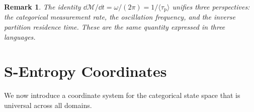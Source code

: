 \documentclass[11pt,twocolumn,a4paper]{article}
\newtheorem{remark}[theorem]{Remark}
\newcommand{\Meas}{\mathcal{M}}
\newcommand{\taup}{\tau_{\mathrm{p}}}
\begin{document}
\begin{remark}
The identity $\dd{\Meas}/\dd{t} = \omega/(2\pi) =
1/\langle \taup \rangle$ unifies three perspectives: the categorical
measurement rate, the oscillation frequency, and the inverse partition
residence time. These are the same quantity expressed in three
languages.
\end{remark}


\section{S-Entropy Coordinates}
\label{sec:sentropy}

We now introduce a coordinate system for the categorical state space
that is universal across all domains.
\end{document}
